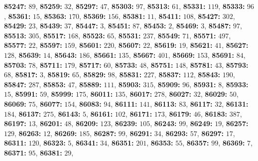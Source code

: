 \textsf{\bfseries 85247:} $89$, \textsf{\bfseries 85259:} $32$, \textsf{\bfseries 85297:} $47$, \textsf{\bfseries 85303:} $97$, \textsf{\bfseries 85313:} $61$, \textsf{\bfseries 85331:} $119$, \textsf{\bfseries 85333:} $96$, \textsf{\bfseries 85361:} $15$, \textsf{\bfseries 85363:} $170$, \textsf{\bfseries 85369:} $156$, \textsf{\bfseries 85381:} $11$, \textsf{\bfseries 85411:} $108$, \textsf{\bfseries 85427:} $302$, \textsf{\bfseries 85429:} $23$, \textsf{\bfseries 85439:} $37$, \textsf{\bfseries 85447:} $3$, \textsf{\bfseries 85451:} $87$, \textsf{\bfseries 85453:} $2$, \textsf{\bfseries 85469:} $3$, \textsf{\bfseries 85487:} $97$, \textsf{\bfseries 85513:} $305$, \textsf{\bfseries 85517:} $168$, \textsf{\bfseries 85523:} $65$, \textsf{\bfseries 85531:} $237$, \textsf{\bfseries 85549:} $71$, \textsf{\bfseries 85571:} $497$, \textsf{\bfseries 85577:} $22$, \textsf{\bfseries 85597:} $159$, \textsf{\bfseries 85601:} $220$, \textsf{\bfseries 85607:} $22$, \textsf{\bfseries 85619:} $19$, \textsf{\bfseries 85621:} $41$, \textsf{\bfseries 85627:} $128$, \textsf{\bfseries 85639:} $14$, \textsf{\bfseries 85643:} $186$, \textsf{\bfseries 85661:} $135$, \textsf{\bfseries 85667:} $401$, \textsf{\bfseries 85669:} $153$, \textsf{\bfseries 85691:} $84$, \textsf{\bfseries 85703:} $78$, \textsf{\bfseries 85711:} $179$, \textsf{\bfseries 85717:} $60$, \textsf{\bfseries 85733:} $48$, \textsf{\bfseries 85751:} $148$, \textsf{\bfseries 85781:} $43$, \textsf{\bfseries 85793:} $68$, \textsf{\bfseries 85817:} $3$, \textsf{\bfseries 85819:} $65$, \textsf{\bfseries 85829:} $98$, \textsf{\bfseries 85831:} $227$, \textsf{\bfseries 85837:} $112$, \textsf{\bfseries 85843:} $190$, \textsf{\bfseries 85847:} $287$, \textsf{\bfseries 85853:} $47$, \textsf{\bfseries 85889:} $111$, \textsf{\bfseries 85903:} $315$, \textsf{\bfseries 85909:} $96$, \textsf{\bfseries 85931:} $8$, \textsf{\bfseries 85933:} $15$, \textsf{\bfseries 85991:} $59$, \textsf{\bfseries 85999:} $175$, \textsf{\bfseries 86011:} $135$, \textsf{\bfseries 86017:} $278$, \textsf{\bfseries 86027:} $32$, \textsf{\bfseries 86029:} $50$, \textsf{\bfseries 86069:} $75$, \textsf{\bfseries 86077:} $154$, \textsf{\bfseries 86083:} $94$, \textsf{\bfseries 86111:} $141$, \textsf{\bfseries 86113:} $83$, \textsf{\bfseries 86117:} $32$, \textsf{\bfseries 86131:} $184$, \textsf{\bfseries 86137:} $275$, \textsf{\bfseries 86143:} $5$, \textsf{\bfseries 86161:} $102$, \textsf{\bfseries 86171:} $173$, \textsf{\bfseries 86179:} $46$, \textsf{\bfseries 86183:} $387$, \textsf{\bfseries 86197:} $13$, \textsf{\bfseries 86201:} $48$, \textsf{\bfseries 86209:} $123$, \textsf{\bfseries 86239:} $105$, \textsf{\bfseries 86243:} $99$, \textsf{\bfseries 86249:} $19$, \textsf{\bfseries 86257:} $129$, \textsf{\bfseries 86263:} $12$, \textsf{\bfseries 86269:} $185$, \textsf{\bfseries 86287:} $99$, \textsf{\bfseries 86291:} $34$, \textsf{\bfseries 86293:} $57$, \textsf{\bfseries 86297:} $17$, \textsf{\bfseries 86311:} $120$, \textsf{\bfseries 86323:} $5$, \textsf{\bfseries 86341:} $34$, \textsf{\bfseries 86351:} $201$, \textsf{\bfseries 86353:} $55$, \textsf{\bfseries 86357:} $99$, \textsf{\bfseries 86369:} $7$, \textsf{\bfseries 86371:} $95$, \textsf{\bfseries 86381:} $29$, 
